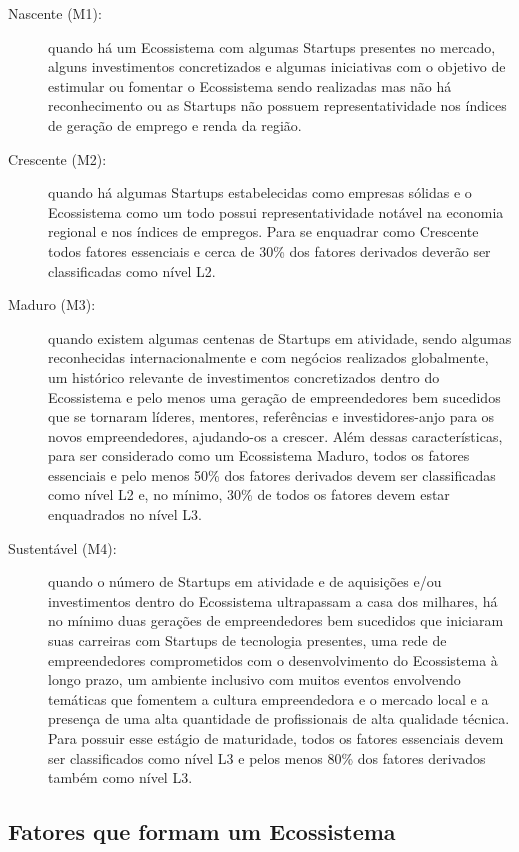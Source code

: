 \begin{description}
  \item [Nascente (M1):] quando há um Ecossistema com algumas Startups presentes no mercado, alguns investimentos concretizados e algumas iniciativas com o objetivo de estimular ou fomentar o Ecossistema sendo realizadas mas não há reconhecimento ou as Startups não possuem representatividade nos índices de geração de emprego e renda da região.

  \item [Crescente (M2):] quando há algumas Startups estabelecidas como empresas sólidas e o Ecossistema como um todo possui representatividade notável na economia regional e nos índices de empregos. Para se enquadrar como Crescente todos fatores essenciais e cerca de 30\% dos fatores derivados deverão ser classificadas como nível L2.

  \item [Maduro (M3):] quando existem algumas centenas de Startups em atividade, sendo algumas reconhecidas internacionalmente e com negócios realizados globalmente, um histórico relevante de investimentos concretizados dentro do Ecossistema e pelo menos uma geração de empreendedores bem sucedidos que se tornaram líderes, mentores, referências e investidores-anjo para os novos empreendedores, ajudando-os a crescer. Além dessas características, para ser considerado como um Ecossistema Maduro, todos os fatores essenciais e pelo menos 50\% dos fatores derivados devem ser classificadas como nível L2 e, no mínimo, 30\% de todos os fatores devem estar enquadrados no nível L3.

  \item [Sustentável (M4):] quando o número de Startups em atividade e de aquisições e/ou investimentos dentro do Ecossistema ultrapassam a casa dos milhares, há no mínimo duas gerações de empreendedores bem sucedidos que iniciaram suas carreiras com Startups de tecnologia presentes, uma rede de empreendedores comprometidos com o desenvolvimento do Ecossistema à longo prazo, um ambiente inclusivo com muitos eventos envolvendo temáticas que fomentem a cultura empreendedora e o mercado local e a presença de uma alta quantidade de profissionais de alta qualidade técnica. Para possuir esse estágio de maturidade, todos os fatores essenciais devem ser classificados como nível L3 e pelos menos 80\% dos fatores derivados também como nível L3.
\end{description}

\subsection{Fatores que formam um Ecossistema}
\label{subsection:fatores_que_formam_um_ecossistema}

